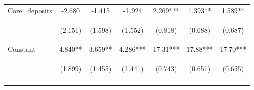 \documentclass[]{article}
\begin{document}
\begin{center}
\begin{tabular}{lcccccc}
Core\_deposits & -2.680 & -1.415 & -1.924 & 2.269*** & 1.393** & 1.589** \\
\vspace{4pt} & \begin{footnotesize}(2.151)\end{footnotesize} & \begin{footnotesize}(1.598)\end{footnotesize} & \begin{footnotesize}(1.552)\end{footnotesize} & \begin{footnotesize}(0.818)\end{footnotesize} & \begin{footnotesize}(0.688)\end{footnotesize} & \begin{footnotesize}(0.687)\end{footnotesize} \\
Constant & 4.840** & 3.659** & 4.286*** & 17.31*** & 17.88*** & 17.70*** \\
 & \begin{footnotesize}(1.899)\end{footnotesize} & \begin{footnotesize}(1.455)\end{footnotesize} & \begin{footnotesize}(1.441)\end{footnotesize} & \begin{footnotesize}(0.743)\end{footnotesize} & \begin{footnotesize}(0.651)\end{footnotesize} & \begin{footnotesize}(0.655)\end{footnotesize} \\
\vspace{4pt} & \begin{footnotesize}\end{footnotesize} & \begin{footnotesize}\end{footnotesize} & \begin{footnotesize}\end{footnotesize} & \begin{footnotesize}\end{footnotesize} & \begin{footnotesize}\end{footnotesize} & \begin{footnotesize}\end{footnotesize} \\

\end{tabular}
\end{center}
\end{document}
